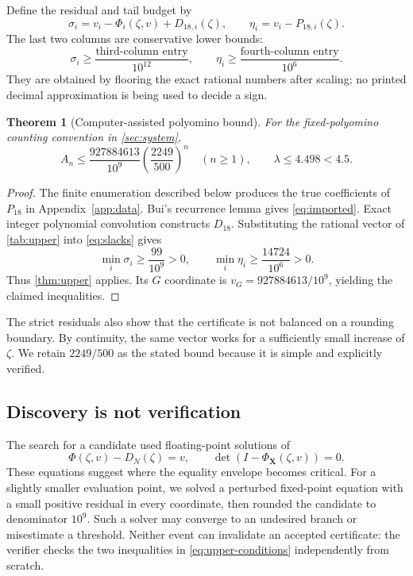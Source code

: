\documentclass[11pt,a4paper]{article}
\newtheorem{theorem}{Theorem}[section]
\theoremstyle{definition}
\theoremstyle{remark}
\newcommand{\bX}{\boldsymbol X}
\begin{document}
Define the residual and tail budget by
\begin{equation}\label{eq:slacks}
 \sigma_i=v_i-\Phi_i(\zeta,v)+D_{18,i}(\zeta),\qquad
 \eta_i=v_i-P_{18,i}(\zeta).
\end{equation}
The last two columns are conservative lower bounds:
\[
 \sigma_i\geq\frac{\text{third-column entry}}{10^{12}},\qquad
 \eta_i\geq\frac{\text{fourth-column entry}}{10^6}.
\]
They are obtained by flooring the exact rational numbers after scaling;
no printed decimal approximation is being used to decide a sign.

\begin{table}[htbp]
\centering\small

\caption{The rational size-$18$ upper certificate and exact lower bounds on
its margins. All vector entries have denominator $10^9$.}
\label{tab:upper}
\end{table}

\begin{theorem}[Computer-assisted polyomino bound]\label{thm:main}
For the fixed-polyomino counting convention in \cref{sec:system},
\[
 A_n\leq\frac{927884613}{10^9}
          \left(\frac{2249}{500}\right)^n\quad(n\geq1),
 \qquad \lambda\leq4.498<4.5.
\]
\end{theorem}
\begin{proof}
The finite enumeration described below produces the true coefficients of
$P_{18}$ in Appendix~\ref{app:data}. Bui's recurrence lemma gives
\eqref{eq:imported}. Exact integer polynomial convolution constructs $D_{18}$.
Substituting the rational vector of \cref{tab:upper} into
\eqref{eq:slacks} gives
\[
 \min_i\sigma_i\geq\frac{99}{10^9}>0,\qquad
 \min_i\eta_i\geq\frac{14724}{10^6}>0.
\]
Thus \cref{thm:upper} applies. Its $G$ coordinate is
$v_G=927884613/10^9$, yielding the claimed inequalities.
\end{proof}

The strict residuals also show that the certificate is not balanced on a
rounding boundary. By continuity, the same vector works for a sufficiently
small increase of $\zeta$. We retain $2249/500$ as the stated bound because
it is simple and explicitly verified.

\subsection{Discovery is not verification}
The search for a candidate used floating-point solutions of
\[
 \Phi(\zeta,v)-D_N(\zeta)=v,
 \qquad \det(I-\Phi_{\bX}(\zeta,v))=0.
\]
These equations suggest where the equality envelope becomes critical.
For a slightly smaller evaluation point, we solved a perturbed fixed-point
equation with a small positive residual in every coordinate, then rounded the
candidate to denominator $10^9$. Such a solver may converge to an undesired
branch or misestimate a threshold. Neither event can invalidate an accepted
certificate: the verifier checks the two inequalities in
\eqref{eq:upper-conditions} independently from scratch.
\end{document}
